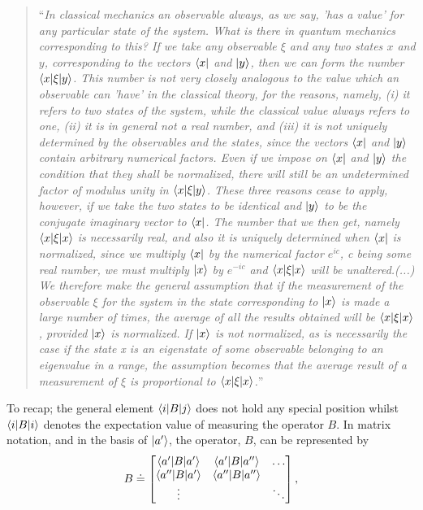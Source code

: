\begin{quote}
	“\textit{In classical mechanics an observable always, as we say, 'has a value' for any particular state of the system. What is there in quantum mechanics corresponding to this? If we take any observable $\xi$ and any two states $x$ and $y$, corresponding to the vectors $\bra{x}$ and $\ket{y}$, then we can form the number $\braket{x|\xi|y}$. This number is not very closely analogous to the value which an observable can 'have' in the classical theory, for the reasons, namely, (i) it refers to \emph{two} states of the system, while the classical value always refers to \emph{one}, (ii) it is in general not a real number, and (iii) it is not uniquely determined by the observables and the states, since the vectors $\bra{x}$ and $\ket{y}$ contain arbitrary numerical factors. Even if we impose on $\bra{x}$ and $\ket{y}$ the condition that they shall be normalized, there will still be an undetermined factor of modulus unity in $\braket{x|\xi|y}$. These three reasons cease to apply, however, if we take the two states to be identical and $\ket{y}$ to be the conjugate imaginary vector to $\bra{x}$. The number that we then get, namely $\braket{x|\xi|x}$ is necessarily real, and also it is uniquely determined when $\bra{x}$ is normalized, since we multiply $\bra{x}$ by the numerical factor $e^{ic}$, c being some real number, we must multiply $\ket{x}$ by $e^{-ic}$ and $\braket{x|\xi|x}$ will be unaltered.\newline(...) We therefore make the general assumption that if the measurement of the observable $\xi$ for the system in the state corresponding to $\ket{x}$ is made a large number of times, the average of all the results obtained will be $\braket{x|\xi|x}$, provided $\ket{x}$ is normalized. If $\ket{x}$ is not normalized, as is necessarily the case if the state x is an eigenstate of some observable belonging to an eigenvalue in a range, the assumption becomes that the average result of a measurement of $\xi$ is proportional to $\braket{x|\xi|x}$.}”
\end{quote}
To recap; the general element $\braket{i|B|j}$ does not hold any special position whilst $\braket{i|B|i}$ denotes the expectation value of measuring the operator $B$. In matrix notation, and in the basis of $\ket{a'}$, the operator, $B$, can be represented by
\begin{equation}
	B\doteq\begin{bmatrix}
		\braket{a'|B|a'} & \braket{a'|B|a''}&\dots\\
		\braket{a''|B|a'} & \braket{a''|B|a''} &\\
		\vdots&  &\ddots\\
	\end{bmatrix},
	\label{matrix11}
\end{equation}  

